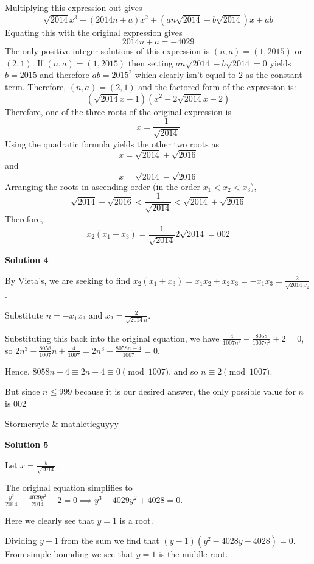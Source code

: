 \begin{enumerate}
 Multiplying this expression out gives 
 \[{{\sqrt{2014}x^3-(2014n+a)x^2+(an{\sqrt{2014}}-b{\sqrt{2014}})x+ab}}\] Equating this with the original expression gives 
 \[{2014n+a}=-4029\] The only positive integer solutions of this expression is $(n, a)=(1, 2015)$ or $(2, 1)$. If $(n, a)=(1, 2015)$ then setting ${an{\sqrt{2014}}-b{\sqrt{2014}}}=0$ yields ${b=2015}$ and therefore ${ab=2015^2}$ which clearly isn't equal to $2$ as the constant term. Therefore, $(n, a)=(2, 1)$ and the factored form of the expression is:
 \[({\sqrt{2014}}x-1)(x^2-2{\sqrt{2014}}x-2)\] Therefore, one of the three roots of the original expression is 
 \[{x=\dfrac{1}{\sqrt{2014}}}\]Using the quadratic formula yields the other two roots as 
 \[{x={\sqrt{2014}}+{\sqrt{2016}}}\] and 
 \[{x={\sqrt{2014}}-{\sqrt{2016}}}\] Arranging the roots in ascending order (in the order $x_1<x_2<x_3$), 
 \[{\sqrt{2014}}-{\sqrt{2016}}<\dfrac{1}{\sqrt{2014}}<{\sqrt{2014}}+{\sqrt{2016}}\]Therefore, 
 \[x_2(x_1+x_3)=\dfrac{1}{\sqrt{2014}}{2\sqrt{2014}}=\boxed{002}\]




\textbf{Solution 4}

By Vieta's, we are seeking to find $x_2(x_1+x_3)=x_1x_2+x_2x_3=-x_1x_3=\frac{2}{\sqrt{2014}x_2}$.

 Substitute $n=-x_1x_3$ and $x_2=\frac{2}{\sqrt{2014}n}$. 

 Substituting this back into the original equation, we have $\frac{4}{1007n^3}-\frac{8058}{1007n^2}+2=0$, so $2n^3-\frac{8058}{1007}n+\frac{4}{1007}=2n^3-\frac{8058n-4}{1007}=0$. 

 Hence, $8058n-4\equiv 2n-4 \equiv 0 \pmod{1007}$, and so $n\equiv 2\pmod{1007}$. 

 But since $n\le 999$ because it is our desired answer, the only possible value for $n$ is $\boxed{002}$

 Stormersyle & mathleticguyyy

 



\textbf{Solution 5}

Let $x =\frac{y}{\sqrt{2014}}.$

 The original equation simplifies to $\frac{y^3}{2014} -\frac{4029y^2}{2014}+2 = 0 \implies y^3 - 4029y^2 + 4028=0.$ 

 Here we clearly see that $y=1$ is a root. 

 Dividing $y-1$ from the sum we find that $(y-1)(y^2-4028y-4028)=0.$ From simple bounding we see that $y=1$ is the middle root. 


\end{enumerate}
